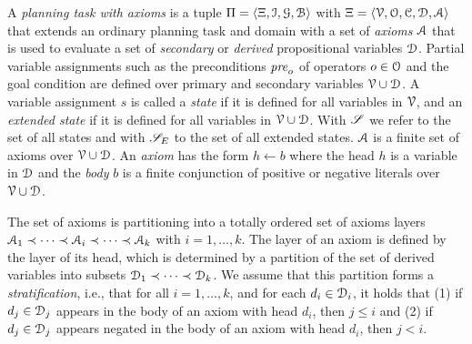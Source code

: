 \begin{definition}\label{def:planning_axioms}
    A \emph{planning task with axioms} is a tuple $\Pi = \langle {\Xi}, \mathcal I, \mathcal G, \mathcal B \rangle$ with ${\Xi} = \langle \mathcal V, \mathcal O, \mathcal C, \mathcal D, \mathcal A \rangle$ that extends an ordinary planning task and domain with a set of \emph{axioms} $\mathcal A$ that is used to evaluate a set of \emph{secondary} or \emph{derived} propositional {variables} $\mathcal D$. Partial variable assignments such as the preconditions $\mathit{pre}_o$ of operators $o \in \mathcal O$ and the goal condition are defined over primary and secondary variables $\mathcal V \cup \mathcal D$.
    A variable assignment $s$ is called a \emph{state} if it is defined for all variables in $\mathcal V$, and an \emph{extended state} if it is defined for all variables in $\mathcal V \cup \mathcal D$.
    With $\mathscr S$ we refer to the set of all states and with $\mathscr S_{E}$ to the set of all extended states.
    $\mathcal A$ is a finite set of axioms over $\mathcal V \cup \mathcal D$. An \emph{axiom} has the form $h \leftarrow b$ where the head $h$ is a variable in $\mathcal D$ and the \emph{body} $b$ is a finite conjunction of positive or negative literals over $\mathcal V \cup \mathcal D$.

    The set of axioms is partitioning into a totally ordered set of axioms layers $\mathcal A_1 \prec \dots \prec \mathcal A_i \prec \dots \prec \mathcal A_k$ with $i=1,\dots,k$. The layer of an axiom is defined by the
    layer of its head, which is determined by a partition of the set of derived
    variables into subsets $\mathcal D_1 \prec \dots \prec \mathcal D_k$.
    We assume that this partition forms a \emph{stratification}, i.e., that for all $i=1, \dots, k$, and for each $d_i \in \mathcal D_i$, it holds that (1) if $d_j \in \mathcal D_j$ appears in the body of an axiom with head $d_i$, then $j \leq i$ and (2) if $d_j \in \mathcal D_j$ appears negated in the body of an axiom with head $d_i$, then $j < i$.
\end{definition}

